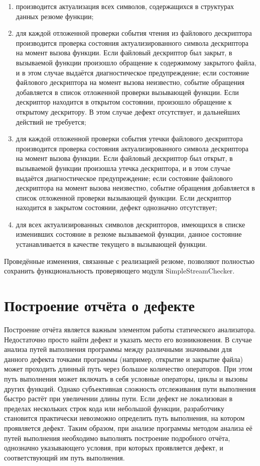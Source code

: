 \begin{enumerate}
 \item производится актуализация всех символов, содержащихся в структурах данных резюме функции;
 \item для каждой отложенной проверки события чтения из файлового дескриптора производится проверка состояния актуализированного символа дескриптора на момент вызова функции. Если файловый дескриптор был закрыт, в вызываемой функции произошло обращение к содержимому закрытого файла, и в этом случае выдаётся диагностическое предупреждение; если состояние файлового дескриптора на момент вызова неизвестно, событие обращения добавляется в список отложенной проверки вызывающей функции. Если дескриптор находится в открытом состоянии, произошло обращение к открытому дескритору. В этом случае дефект отсутствует, и дальнейших действий не требуется;
 \item для каждой отложенной проверки события утечки файлового дескриптора производится проверка состояния актуализированного символа дескриптора на момент вызова функции. Если файловый дескриптор был открыт, в вызываемой функции произошла утечка дескриптора, и в этом случае выдаётся диагностическое предупреждение; если состояние файлового дескриптора на момент вызова неизвестно, событие обращения добавляется в список отложенной проверки вызывающей функции. Если дескриптор находится в закрытом состоянии, дефект однозначно отсутствует;
 \item для всех актуализированных символов дескрипторов, имеющихся в списке изменивших состояние в резюме вызываемой функции, данное состояние устанавливается в качестве текущего в вызывающей функции.
\end{enumerate}

Проведённые изменения, связанные с реализацией резюме, позволяют полностью сохранить функциональность проверяющего модуля SimpleStreamChecker.

\section{Построение отчёта о дефекте}

Построение отчёта является важным элементом работы статического анализатора. Недостаточно просто найти дефект и указать место его возникновения. В случае анализа путей выполнения программы между различными значимыми для данного дефекта точками программы (например, открытие и закрытие файла) может проходить длинный путь через большое количество операторов. При этом путь выполнения может включать в себя условные операторы, циклы и вызовы других функций. Однако субъективная сложность отслеживания пути выполнения быстро растёт при увеличении длины пути. Если дефект не локализован в пределах нескольких строк кода или небольшой функции, разработчику становится практически невозможно определить путь выполнения, на котором проявляется дефект. Таким образом, при анализе программы методом анализа её путей выполнения необходимо выполнять построение подробного отчёта, однозначно указывающего условия, при которых проявляется дефект, и соответствующий им путь выполнения.


